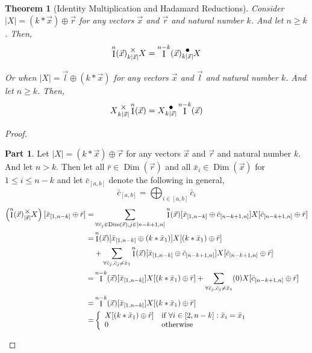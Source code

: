 \documentclass[12pt]{book}
\theoremstyle{plain}
\newtheorem{theorem}{Theorem}[chapter]
\theoremstyle{definition}
\theoremstyle{ppart}
\newtheorem{ppart}{Part}
\theoremstyle{case}
\theoremstyle{solution}
\DeclareMathOperator{\Dim}{Dim}
\DeclareMathOperator{\Ident}{I}
\newcommand{\mmult}[1]{\text{\raisebox{1ex}{$\underset{#1}{\times}$}}}
\newcommand{\dmult}[1]{\text{\raisebox{1ex}{$\underset{#1}{\,\bullet\,}$}}}
\newcommand{\shape}[1]{\left|#1\right|}
\begin{document}
\begin{theorem}[Identity Multiplication and Hadamard Reductions]
Consider $\shape{X} = (k * \vec{x}) \oplus \vec{r}$ for any vectors $\vec{x}$ and $\vec{r}$
and natural number $k$. And let $n \ge k$. Then,
\[ \Ident^n(\vec{x}) \mmult{k\shape{\vec{x}}} X = \Ident^{n-k}(\vec{x}) \dmult{k\shape{\vec{x}}} X \]

Or when $\shape{X} = \vec{l} \oplus (k * \vec{x})$ for any vectors $\vec{x}$ and $\vec{l}$
and natural number $k$. And let $n \ge k$. Then,
\[ X \mmult{k\shape{\vec{x}}} \Ident^n(\vec{x}) = X \dmult{k\shape{\vec{x}}} \Ident^{n-k}(\vec{x}) \]
\end{theorem}
\begin{landscape}
\begin{proof}
\begin{ppart}
Let $\shape{X} = (k * \vec{x}) \oplus \vec{r}$ for any vectors $\vec{x}$ and $\vec{r}$
and natural number $k$. And let $n > k$.
Then let all $\bar{r} \in \Dim(\vec{r})$ and all $\bar{x}_i \in \Dim(\vec{x})$ for $1 \le i \le n-k$ and let
$\bar{c}_{[a,b]}$ denote the following in general,
\[ \bar{c}_{[a,b]} = \bigoplus_{i \in [a,b]} \bar{c}_i \]
\begin{align*}
  \left(\Ident^n(\vec{x}) \mmult{\shape{\vec{x}}} X\right)[\bar{x}_{[1,n-k]} \oplus \bar{r}]
  =& \sum_{\forall \bar{c}_j \in \Dim(\vec{x}), j \in [n-k+1, n]} \Ident^n(\vec{x})[\bar{x}_{[1,n-k]} \oplus \bar{c}_{[n-k+1,n]}] X[\bar{c}_{[n-k+1,n]} \oplus \bar{r}] \\
  =& \Ident^n(\vec{x})[\bar{x}_{[1,n-k]} \oplus (k * \bar{x}_1)] X[(k * \bar{x}_1) \oplus \bar{r}] \\
  &+ \sum_{\forall \bar{c}_j, \bar{c}_j \ne \bar{x}_1}
    \Ident^n(\vec{x})[\bar{x}_{[1,n-k]} \oplus \bar{c}_{[n-k+1,n]}] X[\bar{c}_{[n-k+1,n]} \oplus \bar{r}] \\
  =& \Ident^{n-k}(\vec{x})[\bar{x}_{[1,n-k]}] X[(k * \bar{x}_1) \oplus \bar{r}]
    + \sum_{\forall \bar{c}_j, \bar{c}_j \ne \bar{x}_1}
    (0) X[\bar{c}_{[n-k+1,n]} \oplus \bar{r}] \\
  =& \Ident^{n-k}(\vec{x})[\bar{x}_{[1,n-k]}] X[(k * \bar{x}_1) \oplus \bar{r}] \\
  =& 
    \left\{
      \begin{array}{ll}
        X[(k * \bar{x}_1) \oplus \bar{r}] & \mbox{if } \forall i \in [2,n-k] : \bar{x}_i = \bar{x}_1 \\
        0 & \mbox{otherwise}
      \end{array}
    \right. \\

\end{align*}
\end{ppart}
\end{proof}
\end{landscape}
\end{document}

